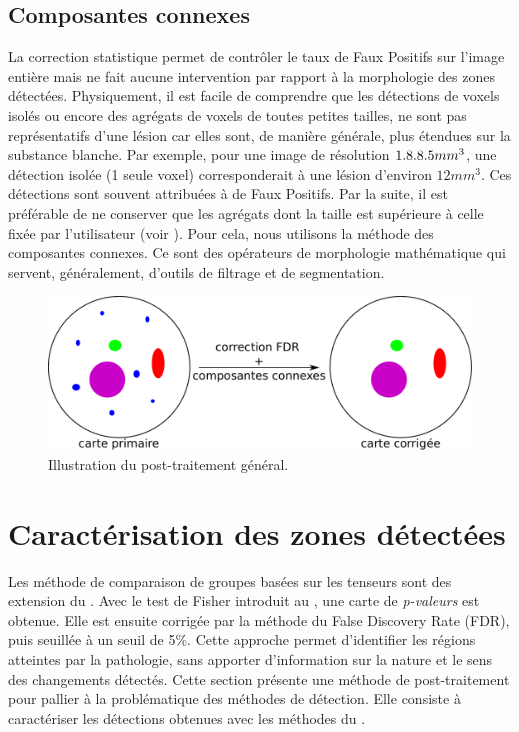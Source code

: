 \subsection{Composantes connexes}
La correction statistique permet de contrôler le taux de Faux Positifs sur l'image entière
mais ne fait aucune intervention par rapport à la morphologie des zones détectées.
Physiquement, il est facile de comprendre que les détections de voxels isolés ou encore des agrégats de voxels de toutes petites tailles, ne sont pas représentatifs d'une lésion 
car elles sont, de manière générale, plus étendues sur la substance blanche.
Par exemple, pour une image de résolution $1.8\time1.8\time3.5 mm^3$, une détection isolée (1 seule voxel) corresponderait à une lésion d'environ $12 mm^3$.
Ces détections sont souvent attribuées à de Faux Positifs.
Par la suite, il est préférable de ne conserver que les agrégats dont la taille est supérieure à celle fixée par l'utilisateur (voir ).
Pour cela, nous utilisons la méthode des composantes connexes.
Ce sont des opérateurs de morphologie mathématique qui servent, généralement, d'outils de filtrage et de segmentation.

\begin{figure}[ht]
  \centering
  \includegraphics[scale=0.5]{Images/etape_carac_1.pdf}
  \caption{\label{etape_carac_1}Illustration du post-traitement général.}
\end{figure}


\section{Caractérisation des zones détectées}
Les méthode de comparaison de groupes basées sur les tenseurs sont des extension du \mlg.
Avec le test de Fisher introduit au , une carte de \textit{p-valeurs} est obtenue.
Elle est ensuite corrigée par la méthode du False Discovery Rate (FDR), puis seuillée à un seuil de 5\%.
Cette approche permet d'identifier les régions atteintes par la pathologie, sans apporter d'information sur la nature et le sens des changements détectés.
Cette section présente une méthode de post-traitement pour pallier à la problématique des méthodes de détection.
Elle consiste à caractériser les détections obtenues avec les méthodes du .


